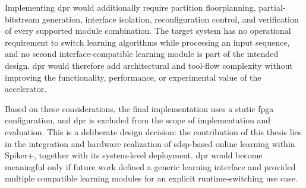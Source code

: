 Implementing \gls{dpr} would additionally require partition floorplanning, partial-bitstream generation, interface isolation, reconfiguration control, and verification of every supported module combination. The target system has no operational requirement to switch learning algorithms while processing an input sequence, and no second interface-compatible learning module is part of the intended design. \gls{dpr} would therefore add architectural and tool-flow complexity without improving the functionality, performance, or experimental value of the accelerator.

Based on these considerations, the final implementation uses a static \gls{fpga} configuration, and \gls{dpr} is excluded from the scope of implementation and evaluation. This is a deliberate design decision: the contribution of this thesis lies in the integration and hardware realization of \gls{sdsp}-based online learning within Spiker+, together with its system-level deployment. \Gls{dpr} would become meaningful only if future work defined a generic learning interface and provided multiple compatible learning modules for an explicit runtime-switching use case.
